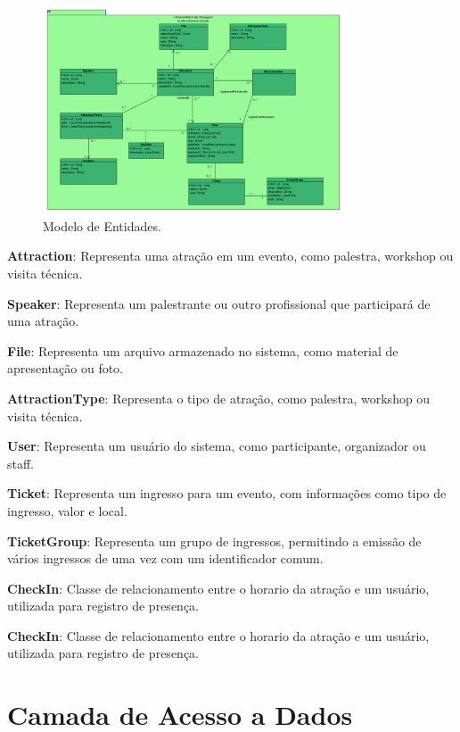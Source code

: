 \begin{figure}[h]
	\centering
	\includegraphics[width=0.8\textwidth]{figuras/ClassesDeDominio.PNG}
	\caption{Modelo de Entidades.}
	\label{figura-dominio}
\end{figure}

\textbf{Attraction}: Representa uma atração em um evento, como palestra, workshop ou visita técnica.

\textbf{Speaker}: Representa um palestrante ou outro profissional que participará de uma atração.

\textbf{File}: Representa um arquivo armazenado no sistema, como material de apresentação ou foto.

\textbf{AttractionType}: Representa o tipo de atração, como palestra, workshop ou visita técnica.

\textbf{User}: Representa um usuário do sistema, como participante, organizador ou staff.

\textbf{Ticket}: Representa um ingresso para um evento, com informações como tipo de ingresso, valor e local.

\textbf{TicketGroup}: Representa um grupo de ingressos, permitindo a emissão de vários ingressos de uma vez com um identificador comum.

\textbf{CheckIn}: Classe de relacionamento entre o horario da atração e um usuário, utilizada para registro de presença.

\textbf{CheckIn}: Classe de relacionamento entre o horario da atração e um usuário, utilizada para registro de presença.



\section{Camada de Acesso a Dados}
\label{sec-frameweb-dados}


